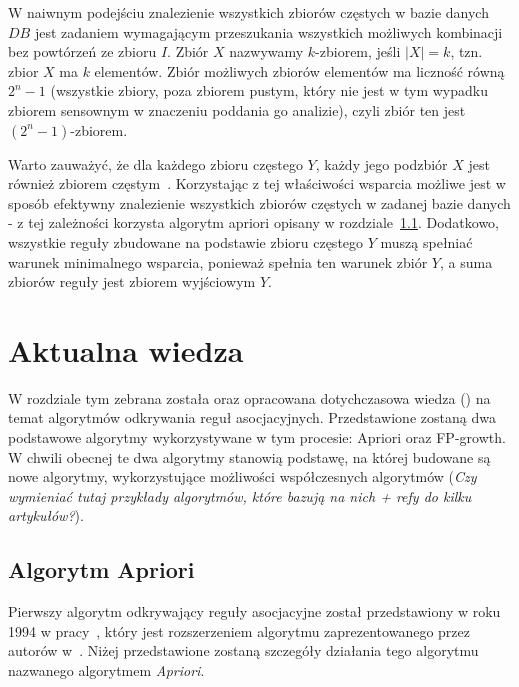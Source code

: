 W naiwnym podejściu znalezienie wszystkich zbiorów częstych w bazie danych $DB$ jest zadaniem wymagającym przeszukania wszystkich możliwych kombinacji bez powtórzeń ze zbioru $I$. Zbiór $X$ nazwywamy $k$-zbiorem, jeśli $|X|=k$, tzn. zbior $X$ ma $k$ elementów. Zbiór możliwych zbiorów elementów ma liczność równą $2^n - 1$ (wszystkie zbiory, poza zbiorem pustym, który nie jest w tym wypadku zbiorem sensownym w znaczeniu poddania go analizie), czyli zbiór ten jest $(2^n - 1)$-zbiorem.

Warto zauważyć, że dla każdego zbioru częstego $Y$, każdy jego podzbiór $X$ jest również zbiorem częstym~\cite{Problem:Statement}. Korzystając z tej właściwości wsparcia możliwe jest w sposób efektywny znalezienie wszystkich zbiorów częstych w zadanej bazie danych - z tej zależności korzysta algorytm apriori opisany w rozdziale~\ref{apriori:section}. Dodatkowo, wszystkie reguły zbudowane na podstawie zbioru częstego $Y$ muszą spełniać warunek minimalnego wsparcia, ponieważ spełnia ten warunek zbiór $Y$, a suma zbiorów reguły jest zbiorem wyjściowym $Y$.

\section{Aktualna wiedza}
W rozdziale tym zebrana została oraz opracowana dotychczasowa wiedza () na temat algorytmów odkrywania reguł asocjacyjnych. Przedstawione zostaną dwa podstawowe algorytmy wykorzystywane w tym procesie: Apriori oraz FP-growth. W chwili obecnej te dwa algorytmy stanowią podstawę, na której budowane są nowe algorytmy, wykorzystujące możliwości współczesnych algorytmów (\emph{Czy wymieniać tutaj przykłady algorytmów, które bazują na nich + refy do kilku artykułów?}).

\subsection{Algorytm Apriori}\label{apriori:section}
Pierwszy algorytm odkrywający reguły asocjacyjne został przedstawiony w roku 1994 w pracy~\cite{Apriori:Main}, który jest rozszerzeniem algorytmu zaprezentowanego przez autorów w~\cite{Problem:Statement}. Niżej przedstawione zostaną szczegóły działania tego algorytmu nazwanego algorytmem \emph{Apriori}.

